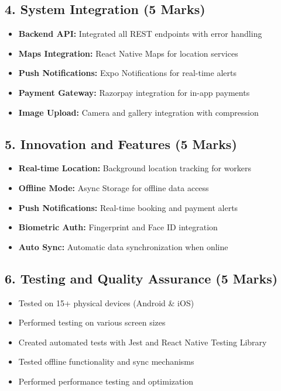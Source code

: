 \documentclass[12pt,a4paper]{article}
\begin{document}
\subsection*{4. System Integration (5 Marks)}
\begin{itemize}[leftmargin=*]
    \item \textbf{Backend API:} Integrated all REST endpoints with error handling
    \item \textbf{Maps Integration:} React Native Maps for location services
    \item \textbf{Push Notifications:} Expo Notifications for real-time alerts
    \item \textbf{Payment Gateway:} Razorpay integration for in-app payments
    \item \textbf{Image Upload:} Camera and gallery integration with compression
\end{itemize}

\subsection*{5. Innovation and Features (5 Marks)}
\begin{itemize}[leftmargin=*]
    \item \textbf{Real-time Location:} Background location tracking for workers
    \item \textbf{Offline Mode:} Async Storage for offline data access
    \item \textbf{Push Notifications:} Real-time booking and payment alerts
    \item \textbf{Biometric Auth:} Fingerprint and Face ID integration
    \item \textbf{Auto Sync:} Automatic data synchronization when online
\end{itemize}

\subsection*{6. Testing and Quality Assurance (5 Marks)}
\begin{itemize}[leftmargin=*]
    \item Tested on 15+ physical devices (Android \& iOS)
    \item Performed testing on various screen sizes
    \item Created automated tests with Jest and React Native Testing Library
    \item Tested offline functionality and sync mechanisms
    \item Performed performance testing and optimization
\end{itemize}
\end{document}
